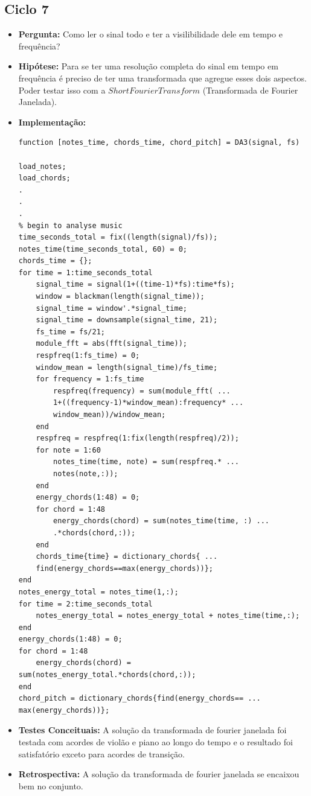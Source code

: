 \subsection{Ciclo 7}
\begin{itemize}
\item \textbf{Pergunta:} Como ler o sinal todo e ter a visilibilidade dele em tempo e frequência?
\item \textbf{Hipótese:} Para se ter uma resolução completa do sinal em tempo em frequência é preciso de ter uma transformada que agregue esses dois aspectos. Poder testar isso com a $Short Fourier Transform$ (Transformada de Fourier Janelada).   
\item \textbf{Implementação:} 
\begin{lstlisting}
function [notes_time, chords_time, chord_pitch] = DA3(signal, fs)

load_notes;
load_chords;
.
.
.
% begin to analyse music
time_seconds_total = fix((length(signal)/fs));
notes_time(time_seconds_total, 60) = 0;
chords_time = {};
for time = 1:time_seconds_total
    signal_time = signal(1+((time-1)*fs):time*fs);
    window = blackman(length(signal_time));
    signal_time = window'.*signal_time;
    signal_time = downsample(signal_time, 21);
    fs_time = fs/21;
    module_fft = abs(fft(signal_time));
    respfreq(1:fs_time) = 0;
    window_mean = length(signal_time)/fs_time;
    for frequency = 1:fs_time
        respfreq(frequency) = sum(module_fft( ...
        1+((frequency-1)*window_mean):frequency* ...
        window_mean))/window_mean;
    end
    respfreq = respfreq(1:fix(length(respfreq)/2));
    for note = 1:60
        notes_time(time, note) = sum(respfreq.* ...
        notes(note,:));    
    end
    energy_chords(1:48) = 0;
    for chord = 1:48
        energy_chords(chord) = sum(notes_time(time, :) ...
        .*chords(chord,:));
    end
    chords_time{time} = dictionary_chords{ ...
    find(energy_chords==max(energy_chords))};
end
notes_energy_total = notes_time(1,:);
for time = 2:time_seconds_total
    notes_energy_total = notes_energy_total + notes_time(time,:);
end
energy_chords(1:48) = 0;
for chord = 1:48
    energy_chords(chord) = sum(notes_energy_total.*chords(chord,:));
end
chord_pitch = dictionary_chords{find(energy_chords== ...
max(energy_chords))};
\end{lstlisting}
\item \textbf{Testes Conceituais:} A solução da transformada de fourier janelada foi testada com acordes de violão e piano ao longo do tempo e o resultado foi satisfatório exceto para acordes de transição.
\item \textbf{Retrospectiva:} A solução da transformada de fourier janelada se encaixou bem no conjunto.  
\end{itemize}

